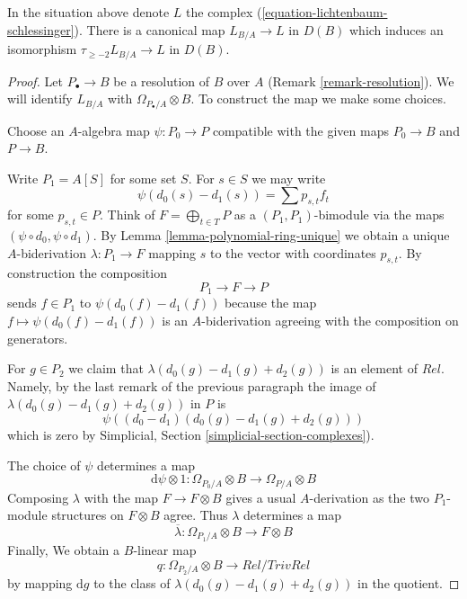%
\begin{lemma}
\label{lemma-compare-higher}
In the situation above denote $L$ the complex
(\ref{equation-lichtenbaum-schlessinger}).
There is a canonical map $L_{B/A} \to L$ in $D(B)$ which
induces an isomorphism $\tau_{\geq -2}L_{B/A} \to L$ in $D(B)$.
\end{lemma}

\begin{proof}
Let $P_\bullet \to B$ be a resolution of $B$ over $A$
(Remark \ref{remark-resolution}). We will identify $L_{B/A}$ with
$\Omega_{P_\bullet/A} \otimes B$. To construct the map we
make some choices.

\medskip\noindent
Choose an $A$-algebra map $\psi : P_0 \to P$ compatible with the
given maps $P_0 \to B$ and $P \to B$.

\medskip\noindent
Write $P_1 = A[S]$ for some set $S$. For $s \in S$ we may write
$$
\psi(d_0(s) - d_1(s)) = \sum p_{s, t} f_t
$$
for some $p_{s, t} \in P$. Think of $F = \bigoplus_{t \in T} P$
as a $(P_1, P_1)$-bimodule via the maps $(\psi \circ d_0, \psi \circ d_1)$.
By Lemma \ref{lemma-polynomial-ring-unique} we obtain a unique
$A$-biderivation $\lambda : P_1 \to F$ mapping $s$ to the vector with
coordinates $p_{s, t}$. By construction the composition
$$
P_1 \longrightarrow F \longrightarrow P
$$
sends $f \in P_1$ to $\psi(d_0(f) - d_1(f))$ because the map
$f \mapsto \psi(d_0(f) - d_1(f))$ is an $A$-biderivation agreeing with
the composition on generators.

\medskip\noindent
For $g \in P_2$ we claim that $\lambda(d_0(g) - d_1(g) + d_2(g))$
is an element of $Rel$. Namely, by the last remark of the previous
paragraph the image of $\lambda(d_0(g) - d_1(g) + d_2(g))$ in $P$ is
$$
\psi((d_0 - d_1)(d_0(g) - d_1(g) + d_2(g)))
$$
which is zero by Simplicial, Section \ref{simplicial-section-complexes}).

\medskip\noindent
The choice of $\psi$ determines a map
$$
\text{d}\psi \otimes 1 :
\Omega_{P_0/A} \otimes B
\longrightarrow
\Omega_{P/A} \otimes B
$$
Composing $\lambda$ with the map $F \to F \otimes B$ gives a
usual $A$-derivation as the two $P_1$-module structures on
$F \otimes B$ agree. Thus $\lambda$ determines a map
$$
\overline{\lambda} :
\Omega_{P_1/A} \otimes B
\longrightarrow
F \otimes B
$$
Finally, We obtain a $B$-linear map
$$
q :
\Omega_{P_2/A} \otimes B
\longrightarrow
Rel/TrivRel
$$
by mapping $\text{d}g$ to the class of $\lambda(d_0(g) - d_1(g) + d_2(g))$
in the quotient.


\end{proof}
